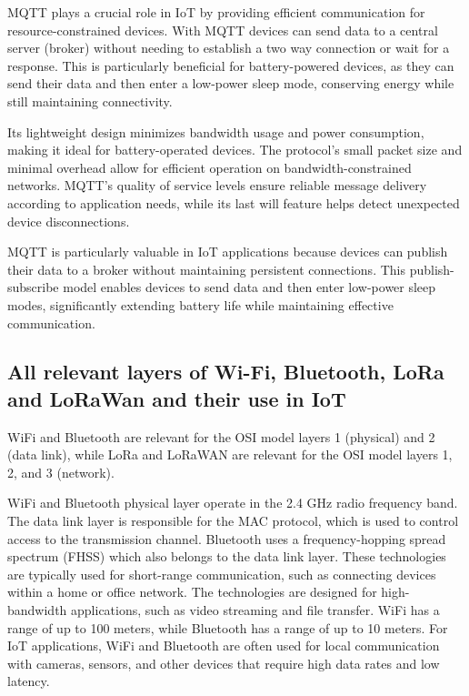MQTT plays a crucial role in IoT by providing efficient communication for resource-constrained devices. With MQTT devices can send data to a central server (broker) without needing to establish a two way connection or wait for a response. This is particularly beneficial for battery-powered devices, as they can send their data and then enter a low-power sleep mode, conserving energy while still maintaining connectivity.

Its lightweight design minimizes bandwidth usage and power consumption, making it ideal for battery-operated devices. The protocol's small packet size and minimal overhead allow for efficient operation on bandwidth-constrained networks. MQTT's quality of service levels ensure reliable message delivery according to application needs, while its last will feature helps detect unexpected device disconnections.

MQTT is particularly valuable in IoT applications because devices can publish their data to a broker without maintaining persistent connections. This publish-subscribe model enables devices to send data and then enter low-power sleep modes, significantly extending battery life while maintaining effective communication.

\subsection{All relevant layers of Wi-Fi, Bluetooth, LoRa and LoRaWan and their use in IoT}

WiFi and Bluetooth are relevant for the OSI model layers 1 (physical) and 2 (data link), while LoRa and LoRaWAN are relevant for the OSI model layers 1, 2, and 3 (network).

WiFi and Bluetooth physical layer operate in the 2.4 GHz radio frequency band. The data link layer is responsible for the MAC protocol, which is used to control access to the transmission channel. Bluetooth uses a frequency-hopping spread spectrum (FHSS) which also belongs to the data link layer\cite{bluetooth_protocol,wifi_osi}.
These technologies are typically used for short-range communication, such as connecting devices within a home or office network. The technologies are designed for high-bandwidth applications, such as video streaming and file transfer. WiFi has a range of up to 100 meters, while Bluetooth has a range of up to 10 meters. For IoT applications, WiFi and Bluetooth are often used for local communication with cameras, sensors, and other devices that require high data rates and low latency.

